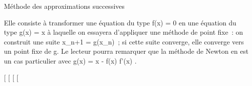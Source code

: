 \documentclass[]{article}
\begin{document}
Méthode des approximations successives

Elle consiste à transformer une équation du type f(x) = 0 en une
équation du type g(x) = x à laquelle on essayera d'appliquer une méthode
de point fixe~: on construit une suite x\_n+1 =
g(x\_n)~; si cette suite converge, elle converge vers un point
fixe de g. Le lecteur pourra remarquer que la méthode de Newton en est
un cas particulier avec g(x) = x - f(x) \over f'(x) .

{[}
{[}
{[}
{[}
\end{document}
